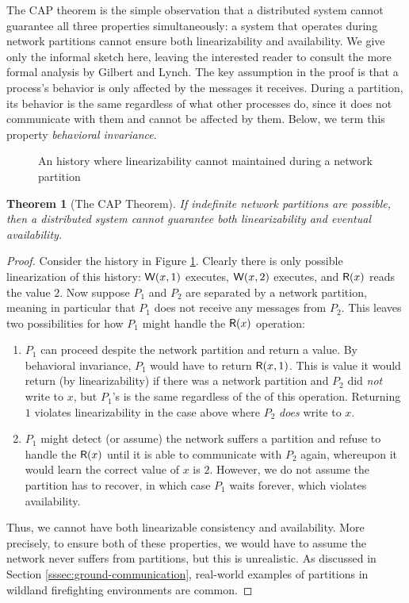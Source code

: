 \documentclass[]             %
{NASA}                       %
\newtheorem{theorem}{Theorem}[section]
\theoremstyle{definition}
\begin{document}
The CAP theorem is the simple observation that a distributed system
cannot guarantee all three properties simultaneously: a system that
operates during network partitions cannot ensure both linearizability
and availability. We give only the informal sketch here, leaving the
interested reader to consult the more formal analysis by Gilbert and
Lynch. The key assumption in the proof is that a process's behavior is
only affected by the messages it receives. During a partition, its
behavior is the same regardless of what other processes do, since it
does not communicate with them and cannot be affected by them. Below,
we term this property \emph{behavioral invariance}.

\begin{figure}
  
  \caption{An history where linearizability cannot maintained during a network partition}
  \label{fig:dsm-cap-example-1}
\end{figure}

\begin{theorem}[The CAP Theorem]
  \label{thm:cap}
  If indefinite network partitions are possible, then a distributed
  system cannot guarantee both linearizability and
  eventual availability.
\end{theorem}
\begin{proof}
  Consider the history in Figure \ref{fig:dsm-cap-example-1}. Clearly
  there is only possible linearization of this history:
  $\mathsf{W}\!\left(x, 1\right)$ executes, $\mathsf{W}\!\left(x, 2\right)$ executes, and
  $\mathsf{R}\!\left(x\right)$ reads the value $2$. Now suppose $P_1$ and $P_2$ are
  separated by a network partition, meaning in particular that $P_1$
  does not receive any messages from $P_2$. This leaves two
  possibilities for how $P_1$ might handle the $\mathsf{R}\!\left(x\right)$
  operation:
  \begin{enumerate}
  \item $P_1$ can proceed despite the network partition and return a
    value. By behavioral invariance, $P_1$ would have to return
    $\mathsf{R}\!\left(x, 1\right)$. This is value it would return (by
    linearizability) if there was a network partition and $P_2$ did
    \emph{not} write to $x$, but $P_1$'s is the same regardless of the
    of this operation. Returning $1$ violates linearizability in the
    case above where $P_2$ \emph{does} write to $x$.
  \item $P_1$ might detect (or assume) the network suffers a partition
    and refuse to handle the $\mathsf{R}\!\left(x\right)$ until it is able to
    communicate with $P_2$ again, whereupon it would learn the correct
    value of $x$ is $2$. However, we do not assume the partition has
    to recover, in which case $P_1$ waits forever, which violates
    availability.
  \end{enumerate}
  Thus, we cannot have both linearizable consistency and
  availability. More precisely, to ensure both of these properties, we
  would have to assume the network never suffers from partitions, but
  this is unrealistic. As discussed in Section
  \ref{sssec:ground-communication}, real-world examples of partitions
  in wildland firefighting environments are common.
\end{proof}
\end{document}
